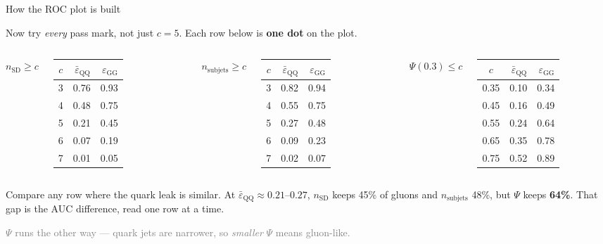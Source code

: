 \documentclass[aspectratio=169,10pt]{beamer}
\newcommand{\psic}[1]{\textcolor{psiblue}{#1}}
\newcommand{\sdc}[1]{\textcolor{sdorange}{#1}}
\newcommand{\sjc}[1]{\textcolor{sjgreen}{#1}}
\begin{document}
\begin{frame}{How the ROC plot is built}

Now try \emph{every} pass mark, not just $c = 5$. Each row below is
\textbf{one dot} on the plot.

\vspace{0.8em}
\centering\footnotesize
\begin{columns}[T]
\centering
\sdc{$n_{\mathrm{SD}} \ge c$}\\[0.3em]
\begin{tabular}{crr}
\toprule
$c$ & $\bar{\varepsilon}_{\mathrm{QQ}}$ & $\varepsilon_{\mathrm{GG}}$ \\
\midrule
3 & 0.76 & 0.93 \\
4 & 0.48 & 0.75 \\
5 & 0.21 & 0.45 \\
6 & 0.07 & 0.19 \\
7 & 0.01 & 0.05 \\
\bottomrule
\end{tabular}

\centering
\sjc{$n_{\mathrm{subjets}} \ge c$}\\[0.3em]
\begin{tabular}{crr}
\toprule
$c$ & $\bar{\varepsilon}_{\mathrm{QQ}}$ & $\varepsilon_{\mathrm{GG}}$ \\
\midrule
3 & 0.82 & 0.94 \\
4 & 0.55 & 0.75 \\
5 & 0.27 & 0.48 \\
6 & 0.09 & 0.23 \\
7 & 0.02 & 0.07 \\
\bottomrule
\end{tabular}

\centering
\psic{$\Psi(0.3) \le c$}\\[0.3em]
\begin{tabular}{crr}
\toprule
$c$ & $\bar{\varepsilon}_{\mathrm{QQ}}$ & $\varepsilon_{\mathrm{GG}}$ \\
\midrule
0.35 & 0.10 & 0.34 \\
0.45 & 0.16 & 0.49 \\
0.55 & 0.24 & 0.64 \\
0.65 & 0.35 & 0.78 \\
0.75 & 0.52 & 0.89 \\
\bottomrule
\end{tabular}
\end{columns}

\vspace{1em}
\flushleft\normalsize
Compare any row where the quark leak is similar. At
$\bar{\varepsilon}_{\mathrm{QQ}} \approx 0.21$--$0.27$, \sdc{$n_{\mathrm{SD}}$}
keeps 45\% of gluons and \sjc{$n_{\mathrm{subjets}}$} 48\%, but
\psic{$\Psi$} keeps \textbf{64\%}. That gap is the AUC difference, read one
row at a time.

\vspace{0.6em}
\footnotesize
\textcolor{gray}{$\Psi$ runs the other way --- quark jets are narrower, so
\emph{smaller} $\Psi$ means gluon-like.}

\end{frame}
\end{document}
